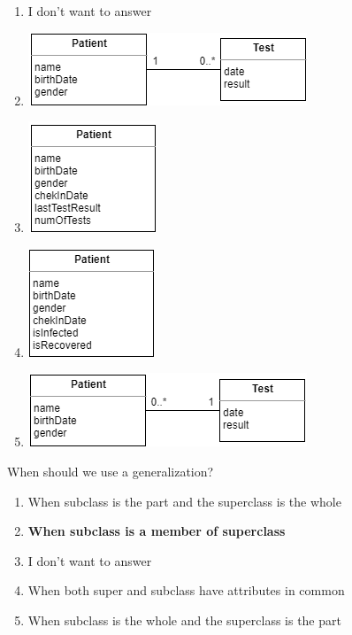 \documentclass{bdad}
\begin{document}
\begin{enumerate}
    \item I don't want to answer
    \item \includegraphics[scale=0.8]{2020T-03b.png} \greencheckmark
    \item \includegraphics[scale=0.8]{2020T-03c.png}
    \item \includegraphics[scale=0.8]{2020T-03d.png}
    \item \includegraphics[scale=0.8]{2020T-03e.png}
\end{enumerate}

When should we use a generalization?

\begin{enumerate}
    \item \label{itm:2020N_a} When subclass is the part and the superclass is the whole
    \item \label{itm:2020N_b} \textbf{When subclass is a member of superclass \greencheckmark}
    \item \label{itm:2020N_c} I don't want to answer
    \item \label{itm:2020N_d} When both super and subclass have attributes in common
    \item \label{itm:2020N_e} When subclass is the whole and the superclass is the part
\end{enumerate}
\end{document}
